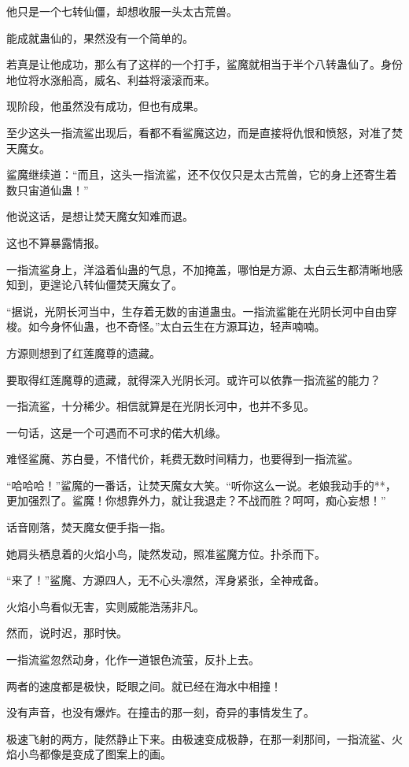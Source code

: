 \begin{this_body}
他只是一个七转仙僵，却想收服一头太古荒兽。

能成就蛊仙的，果然没有一个简单的。

若真是让他成功，那么有了这样的一个打手，鲨魔就相当于半个八转蛊仙了。身份地位将水涨船高，威名、利益将滚滚而来。

现阶段，他虽然没有成功，但也有成果。

至少这头一指流鲨出现后，看都不看鲨魔这边，而是直接将仇恨和愤怒，对准了焚天魔女。

鲨魔继续道：“而且，这头一指流鲨，还不仅仅只是太古荒兽，它的身上还寄生着数只宙道仙蛊！”

他说这话，是想让焚天魔女知难而退。

这也不算暴露情报。

一指流鲨身上，洋溢着仙蛊的气息，不加掩盖，哪怕是方源、太白云生都清晰地感知到，更遑论八转仙僵焚天魔女了。

“据说，光阴长河当中，生存着无数的宙道蛊虫。一指流鲨能在光阴长河中自由穿梭。如今身怀仙蛊，也不奇怪。”太白云生在方源耳边，轻声喃喃。

方源则想到了红莲魔尊的遗藏。

要取得红莲魔尊的遗藏，就得深入光阴长河。或许可以依靠一指流鲨的能力？

一指流鲨，十分稀少。相信就算是在光阴长河中，也并不多见。

一句话，这是一个可遇而不可求的偌大机缘。

难怪鲨魔、苏白曼，不惜代价，耗费无数时间精力，也要得到一指流鲨。

“哈哈哈！”鲨魔的一番话，让焚天魔女大笑。“听你这么一说。老娘我动手的**，更加强烈了。鲨魔！你想靠外力，就让我退走？不战而胜？呵呵，痴心妄想！”

话音刚落，焚天魔女便手指一指。

她肩头栖息着的火焰小鸟，陡然发动，照准鲨魔方位。扑杀而下。

“来了！”鲨魔、方源四人，无不心头凛然，浑身紧张，全神戒备。

火焰小鸟看似无害，实则威能浩荡非凡。

然而，说时迟，那时快。

一指流鲨忽然动身，化作一道银色流萤，反扑上去。

两者的速度都是极快，眨眼之间。就已经在海水中相撞！

没有声音，也没有爆炸。在撞击的那一刻，奇异的事情发生了。

极速飞射的两方，陡然静止下来。由极速变成极静，在那一刹那间，一指流鲨、火焰小鸟都像是变成了图案上的画。


\end{this_body}
